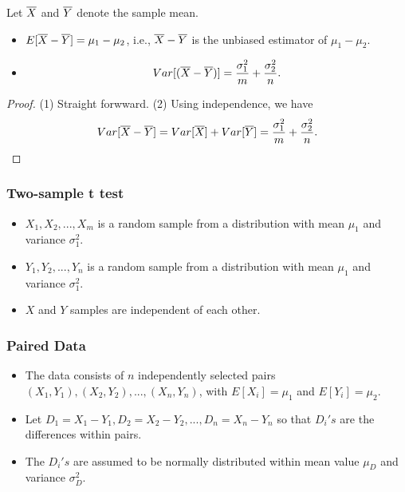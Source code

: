 \begin{refsection}
\begin{lemma}\cite[363]{devore2015probability}Let $\overline{X}$ and $\overline{Y}$ denote the sample mean.
\begin{itemize}
	\item $E[\overline{X} - \overline{Y}] = \mu_1 - \mu_2$, i.e., $\overline{X} - \overline{Y}$ is the unbiased estimator of $\mu_1-\mu_2$.
	\item $$Var[(\overline{X} - \overline{Y})]=\frac{\sigma_1^2}{m} + \frac{\sigma_2^2}{n}.$$
\end{itemize}	
\end{lemma}
\begin{proof}
(1) Straight forwward. (2) Using independence, we have
$$Var[\overline{X} - \overline{Y}] = Var[\overline{X}] + Var[\overline{Y}] = \frac{\sigma_1^2}{m} + \frac{\sigma_2^2}{n}.$$

\end{proof}


\subsubsection{Two-sample t test}
\begin{note}\hfill
	\begin{itemize}
		\item $X_1,X_2,...,X_m$ is a random sample from a distribution with mean $\mu_1$ and variance $\sigma_1^2$.
		\item $Y_1,Y_2,...,Y_n$ is a random sample from a distribution with mean $\mu_1$ and variance $\sigma_1^2$.
		\item $X$ and $Y$ samples are independent of each other. 
	\end{itemize}	
\end{note}


\subsubsection{Paired Data}



\begin{note}\hfill
\begin{itemize}
	\item The data consists of $n$ independently selected pairs $(X_1,Y_1), (X_2,Y_2),...,(X_n,Y_n)$, with $E[X_i] = \mu_1$ and $E[Y_i] = \mu_2$. 
	\item Let $D_1 = X_1-Y_1, D_2 = X_2 - Y_2,..., D_n = X_n - Y_n$ so that $D_i's$ are the differences within pairs. 
	\item The $D_i's$ are assumed to be normally distributed within mean value $\mu_D$ and variance $\sigma_D^2$.
\end{itemize}	
\end{note}





\end{refsection}
